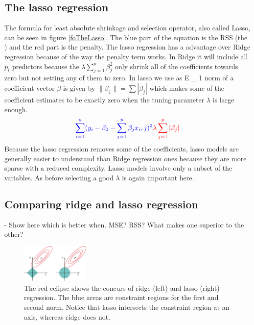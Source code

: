 \subsection{The lasso regression}
The formula for least absolute shrinkage and selection operator, also called Lasso, can be seen in figure \ref{foTheLasso}. The blue part of the equation is the RSS (the ) and the red part is the penalty. The lasso regression has a advantage over Ridge regression because of the way the penalty term works. In Ridge it will include all $p_i$ predictors because the $\lambda \sum_{j=1}^{p} \beta^2_j$ only shrink all of the coefficients towards zero but not setting any of them to zero. In lasso we use as E \_ 1 norm of a coefficient vector $\beta$ is given by $ \lVert \beta_1 \rVert = \sum | \beta_j |$ which makes some of the coefficient estimates to be exactly zero when the tuning parameter $\lambda$ is large enough.
\begin{align}\label{fo:TheLasso}
\color{blue} \sum_{i=1}^{n} ( y_i - \beta_0 - \sum_{j=1}^{p} \beta_j x_i,j )^2  \color{red} \lambda \sum_{j=1}^{p} |\beta_j|
\end{align}
Because the lasso regression removes some of the coefficients, lasso models are generally easier to understand than Ridge regression ones because they are  more sparse with a reduced complexity. Lasso models involve only a subset of the variables. As before selecting a good $\lambda$ is again important here.

\subsection{Comparing ridge and lasso regression}

- Show here which is better when. MSE? RSS? What makes one superior to the other?


\begin{figure}[H]
	\centering
	\includegraphics[width=0.3\textwidth]{shrinkageMethods/fig/normsL1_L2.jpg}
	\caption{The red eclipse shows the concurs of ridge (left) and lasso (right) regression. The blue areas are constraint regions for the first and second norm. Notice that lasso intersects the constraint region at an axis, whereas ridge does not.}
	\label{fig:normfirstsecond}
\end{figure}

